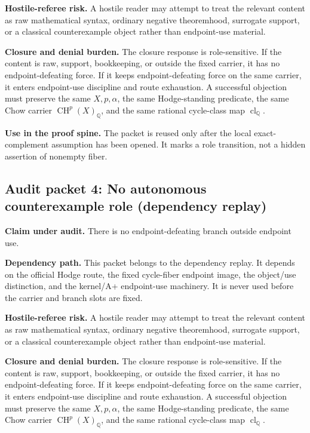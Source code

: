 \documentclass[11pt]{article}
\newcommand{\QQ}{\mathbb{Q}}
\newcommand{\CH}{\operatorname{CH}}
\newcommand{\clQ}{\operatorname{cl}_{\QQ}}
\begin{document}
\par\noindent\textbf{Hostile-referee risk.} A hostile reader may attempt to treat the relevant content as raw mathematical syntax, ordinary negative theoremhood, surrogate support, or a classical counterexample object rather than endpoint-use material.


\par\noindent\textbf{Closure and denial burden.} The closure response is role-sensitive. If the content is raw, support, bookkeeping, or outside the fixed carrier, it has no endpoint-defeating force. If it keeps endpoint-defeating force on the same carrier, it enters endpoint-use discipline and route exhaustion. A successful objection must preserve the same $X,p,\alpha$, the same Hodge-standing predicate, the same Chow carrier $\CH^p(X)_\QQ$, and the same rational cycle-class map $\clQ$.


\par\noindent\textbf{Use in the proof spine.} The packet is reused only after the local exact-complement assumption has been opened. It marks a role transition, not a hidden assertion of nonempty fiber.


\subsection{Audit packet 4: No autonomous counterexample role (dependency replay)}


\par\noindent\textbf{Claim under audit.} There is no endpoint-defeating branch outside endpoint use.


\par\noindent\textbf{Dependency path.} This packet belongs to the dependency replay. It depends on the official Hodge route, the fixed cycle-fiber endpoint image, the object/use distinction, and the kernel/A+ endpoint-use machinery. It is never used before the carrier and branch slots are fixed.


\par\noindent\textbf{Hostile-referee risk.} A hostile reader may attempt to treat the relevant content as raw mathematical syntax, ordinary negative theoremhood, surrogate support, or a classical counterexample object rather than endpoint-use material.


\par\noindent\textbf{Closure and denial burden.} The closure response is role-sensitive. If the content is raw, support, bookkeeping, or outside the fixed carrier, it has no endpoint-defeating force. If it keeps endpoint-defeating force on the same carrier, it enters endpoint-use discipline and route exhaustion. A successful objection must preserve the same $X,p,\alpha$, the same Hodge-standing predicate, the same Chow carrier $\CH^p(X)_\QQ$, and the same rational cycle-class map $\clQ$.
\end{document}
